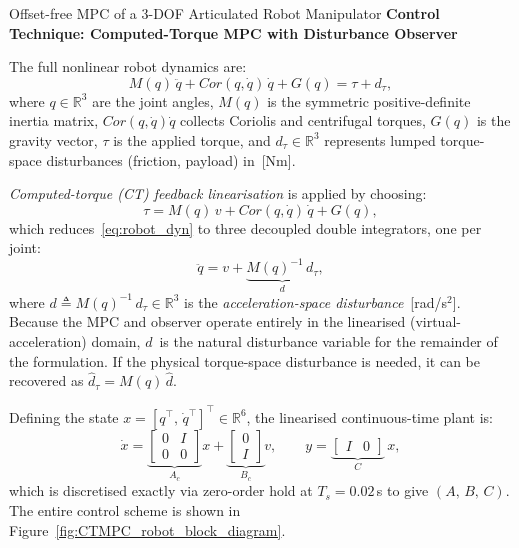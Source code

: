 \begin{examplebox}{Offset-free MPC of a 3-DOF Articulated Robot Manipulator}
	\vspace{0.4em}
	\textbf{\textsf{Control Technique: Computed-Torque MPC with Disturbance Observer}}
	
	The full nonlinear robot dynamics are:
	\begin{equation}
		M(q)\,\ddot{q} + Cor(q,\dot{q})\,\dot{q} + G(q) = \tau + d_{\tau},
		\label{eq:robot_dyn}
	\end{equation}
	where $q \in \mathbb{R}^{3}$ are the joint angles, $M(q)$ is the symmetric
	positive-definite inertia matrix, $Cor(q,\dot{q})\dot{q}$ collects Coriolis and
	centrifugal torques, $G(q)$ is the gravity vector, $\tau$ is the applied torque, and
	$d_{\tau} \in \mathbb{R}^{3}$ represents lumped torque-space disturbances
	(friction, payload) in~[Nm].
	
	\emph{Computed-torque (CT) feedback linearisation} is applied by choosing:
	\begin{equation*}
		\tau = M(q)\,v + Cor(q,\dot{q})\,\dot{q} + G(q),
	\end{equation*}
	which reduces~\eqref{eq:robot_dyn} to three decoupled double integrators,
	one per joint:
	\begin{equation*}
		\ddot{q} = v + \underbrace{M(q)^{-1}\,d_{\tau}}_{\displaystyle d},
	\end{equation*}
	where $d \triangleq M(q)^{-1}\,d_{\tau} \in \mathbb{R}^{3}$ is the
	\emph{acceleration-space disturbance}~[rad/s$^{2}$].
	Because the MPC and observer operate entirely in the linearised
	(virtual-acceleration) domain, $d$~is the natural disturbance variable
	for the remainder of the formulation.
	If the physical torque-space disturbance is needed, it can be recovered as
	$\hat{d}_{\tau} = M(q)\,\hat{d}$.
	
	Defining the state $x = [q^{\top},\,\dot{q}^{\top}]^{\top} \in \mathbb{R}^{6}$,
	the linearised continuous-time plant is:
	\begin{equation*}
		\dot{x} =
		\underbrace{\begin{bmatrix}0 & I \\ 0 & 0\end{bmatrix}}_{A_c}x +
		\underbrace{\begin{bmatrix}0 \\ I\end{bmatrix}}_{B_c}v, \qquad
		y = \underbrace{\begin{bmatrix}I & 0\end{bmatrix}}_{C}\,x,
	\end{equation*}
	which is discretised exactly via zero-order hold at $T_s = 0.02$\,s to give
	$(A,\,B,\,C)$. The entire control scheme is shown in Figure~\ref{fig:CTMPC_robot_block_diagram}.
	

\end{examplebox}
